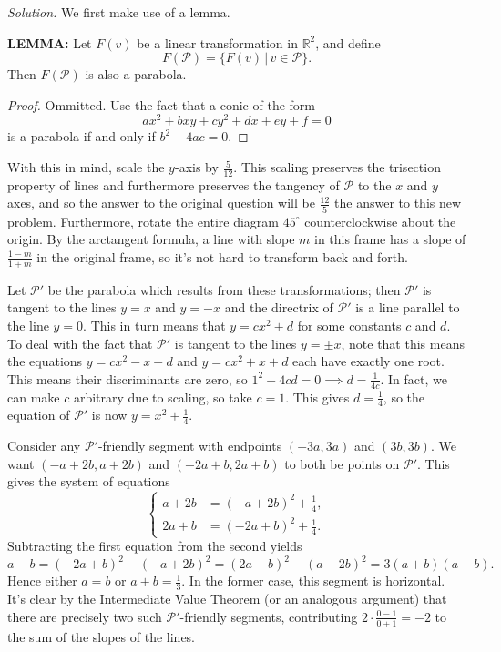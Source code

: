 \documentclass[10pt]{article}
\newcommand{\solution}
{
\vspace{5pt}
\noindent\textit{Solution.}\qquad
}
\begin{document}
\begin{enumerate}
\solution We first make use of a lemma.

\par\textbf{LEMMA: }Let $F(v)$ be a linear transformation in $\mathbb{R}^2$, and define \[F(\mathcal{P})=\{F(v)\,|\, v\in\mathcal{P}\}.\] Then $F(\mathcal{P})$ is also a parabola.

\begin{proof}Ommitted.  Use the fact that a conic of the form \[ax^2+bxy+cy^2+dx+ey+f=0\] is a parabola if and only if $b^2-4ac=0$.
\end{proof}

With this in mind, scale the $y$-axis by $\tfrac5{12}$.  This scaling preserves the trisection property of lines and furthermore preserves the tangency of $\mathcal{P}$ to the $x$ and $y$ axes, and so the answer to the original question will be $\tfrac{12}5$ the answer to this new problem.  Furthermore, rotate the entire diagram $45^\circ$ counterclockwise about the origin.  By the arctangent formula, a line with slope $m$ in this frame has a slope of $\tfrac{1-m}{1+m}$ in the original frame, so it's not hard to transform back and forth.

\par Let $\mathcal{P}'$ be the parabola which results from these transformations; then $\mathcal{P'}$ is tangent to the lines $y=x$ and $y=-x$ and the directrix of $\mathcal{P'}$ is a line parallel to the line $y=0$.  This in turn means that $y=cx^2+d$ for some constants $c$ and $d$.  To deal with the fact that $\mathcal{P'}$ is tangent to the lines $y=\pm x$, note that this means the equations $y=cx^2-x+d$ and $y=cx^2+x+d$ each have exactly one root.  This means their discriminants are zero, so $1^2-4cd = 0\implies d=\tfrac{1}{4c}$.  In fact, we can make $c$ arbitrary due to scaling, so take $c=1$.  This gives $d=\tfrac14$, so the equation of $\mathcal{P}'$ is now $y=x^2+\tfrac14$.

\par Consider any $\mathcal{P}'$-friendly segment with endpoints $(-3a,3a)$ and $(3b,3b)$.  We want $(-a+2b,a+2b)$ and $(-2a+b,2a+b)$ to both be points on $\mathcal{P}'$.  This gives the system of equations \[\begin{cases}a+2b&=(-a+2b)^2+\frac14,\\2a+b&=(-2a+b)^2+\frac14.\end{cases}\] Subtracting the first equation from the second yields \[a-b=(-2a+b)^2-(-a+2b)^2=(2a-b)^2-(a-2b)^2=3(a+b)(a-b).\] Hence either $a=b$ or $a+b=\tfrac13$.  In the former case, this segment is horizontal.  It's clear by the Intermediate Value Theorem (or an analogous argument) that there are precisely two such $\mathcal{P}'$-friendly segments, contributing $2\cdot\tfrac{0-1}{0+1}=-2$ to the sum of the slopes of the lines.


\end{enumerate}
\end{document}
